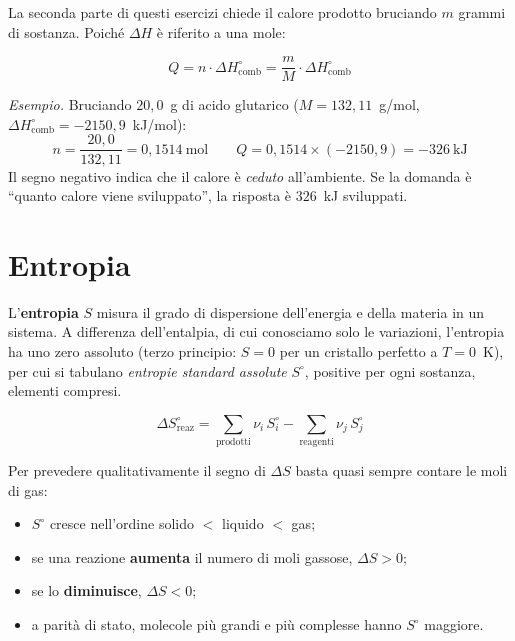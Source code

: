 \documentclass[11pt, a4paper, openright]{book}
\begin{document}
La seconda parte di questi esercizi chiede il calore prodotto bruciando $m$ grammi di
sostanza. Poiché $\Delta H$ è riferito a una mole:

\begin{equation}
  Q = n \cdot \Delta H^\circ_{\text{comb}} = \frac{m}{M} \cdot \Delta H^\circ_{\text{comb}}
\end{equation}

\emph{Esempio.} Bruciando $20{,}0$~g di acido glutarico 
($M = 132{,}11$~g/mol, $\Delta H^\circ_{\text{comb}} = -2150{,}9$~kJ/mol):
\begin{equation*}
  n = \frac{20{,}0}{132{,}11} = 0{,}1514 \ \text{mol}
  \qquad
  Q = 0{,}1514 \times (-2150{,}9) = -326 \ \text{kJ}
\end{equation*}
Il segno negativo indica che il calore è \emph{ceduto} all'ambiente. Se la domanda è
``quanto calore viene sviluppato'', la risposta è $326$~kJ sviluppati.


\section{Entropia}

L'\textbf{entropia} $S$ misura il grado di dispersione dell'energia e della materia in un
sistema. A differenza dell'entalpia, di cui conosciamo solo le variazioni, l'entropia ha
uno zero assoluto (terzo principio: $S = 0$ per un cristallo perfetto a $T = 0$~K), per
cui si tabulano \emph{entropie standard assolute} $S^\circ$, positive per ogni sostanza,
elementi compresi.

\begin{equation}
  \Delta S^\circ_{\text{reaz}} = \sum_{\text{prodotti}} \nu_i \, S^\circ_i
                               - \sum_{\text{reagenti}} \nu_j \, S^\circ_j
\end{equation}

Per prevedere qualitativamente il segno di $\Delta S$ basta quasi sempre contare le moli
di gas:

\begin{itemize}
  \item $S^\circ$ cresce nell'ordine solido $<$ liquido $<$ gas;
  \item se una reazione \textbf{aumenta} il numero di moli gassose, $\Delta S > 0$;
  \item se lo \textbf{diminuisce}, $\Delta S < 0$;
  \item a parità di stato, molecole più grandi e più complesse hanno $S^\circ$ maggiore.
\end{itemize}
\end{document}
